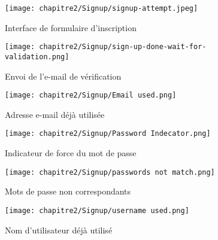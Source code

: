 \begin{figure}[h!]
\vspace*{0pt}
  \centering

  \begin{minipage}[t]{0.45\textwidth}
    \vspace*{0pt} %
    \centering
    \texttt{[image: chapitre2/Signup/signup-attempt.jpeg]}
    \caption{Interface de formulaire d'inscription}
    \label{fig:3.28}
  \end{minipage}%
  \hspace{1cm}
  \begin{minipage}[t]{0.45\textwidth}
    \vspace*{0pt} %
    \centering
    \texttt{[image: chapitre2/Signup/sign-up-done-wait-for-validation.png]}
    \caption{Envoi de l'e-mail de vérification}
    \label{fig:3.29}
  \end{minipage}
\end{figure}
\begin{figure}[H]
  \centering

  \begin{minipage}[t]{0.45\textwidth}
    \centering
    \texttt{[image: chapitre2/Signup/Email used.png]}
    \caption{Adresse e-mail déjà utilisée}
    \label{fig:3.30}
  \end{minipage}
  \hspace{1cm}
  \begin{minipage}[t]{0.45\textwidth}
    \centering
    \texttt{[image: chapitre2/Signup/Password Indecator.png]}
    \caption{Indicateur de force du mot de passe}
    \label{fig:3.31}
  \end{minipage}

\vspace{0.5cm} %
\end{figure}



\clearpage
\begin{figure}[H]
  \centering
  \begin{minipage}[t]{0.45\textwidth}
    \centering
    \texttt{[image: chapitre2/Signup/passwords not match.png]}
    \caption{Mots de passe non correspondants}
    \label{fig:3.32}
  \end{minipage}
  \hspace{1cm}
  \begin{minipage}[t]{0.45\textwidth}
    \centering
    \texttt{[image: chapitre2/Signup/username used.png]}
    \caption{Nom d'utilisateur déjà utilisé}
    \label{fig:3.33}
  \end{minipage}
\end{figure}


